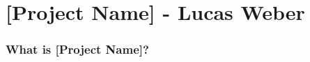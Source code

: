 \section{[Project Name] - Lucas Weber}


\begin{frame}
	\frametitle{What is [Project Name]?}
\end{frame}
